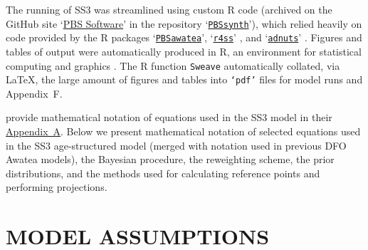 \documentclass[11pt]{book}
\newcommand{\code}[1]{\normalsize\texttt{#1}\normalsize}%
\newcommand{\AppRes}{Appendix~F}
\begin{document}
The running of SS3 was streamlined using custom R code (archived on the GitHub site `\href{https://github.com/pbs-software}{PBS Software}' in the repository `\href{https://github.com/pbs-software/pbs-synth}{\code{PBSsynth}}'), which relied heavily on code provided by the R packages `\href{https://github.com/pbs-software/pbs-awatea}{\code{PBSawatea}}', `\href{https://github.com/r4ss/r4ss}{\code{r4ss}}' \citep{R:2021_r4ss}, and `\href{https://github.com/Cole-Monnahan-NOAA/adnuts}{\code{adnuts}}' \citep{R:2018_adnuts}.
Figures and tables of output were automatically produced in R, an environment for statistical computing and graphics \citep{R:2021_base}. 
The R function \code{Sweave} \citep{Leisch:2002} automatically collated, via \LaTeX, the large amount of figures and tables into \code{`pdf'} files for model runs and \AppRes.

\citet{Methot-Wetzel:2013} provide mathematical notation of equations used in the SS3 model in their \href{https://sedarweb.org/docs/wsupp/S39_RD_08_Methot_and_Wetzel_2013_Fish_Res_App_A.pdf}{Appendix~A}.
Below we present mathematical notation of selected equations used in the SS3 age-structured model (merged with notation used in previous DFO Awatea models), the Bayesian procedure, the reweighting scheme, the prior distributions, and the methods used for calculating reference points and performing projections.

\clearpage
\section{MODEL ASSUMPTIONS}
\end{document}
